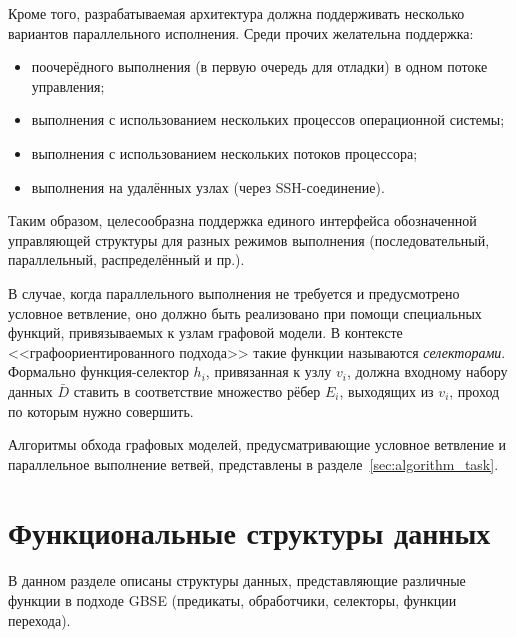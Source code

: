 Кроме того, разрабатываемая архитектура должна поддерживать несколько вариантов параллельного исполнения. Среди прочих желательна поддержка:
\begin{itemize}
    \item поочерёдного выполнения (в первую очередь для отладки) в одном потоке управления;
    \item выполнения с использованием нескольких процессов операционной системы;
    \item выполнения с использованием нескольких потоков процессора;
    \item выполнения на удалённых узлах (через SSH-соединение).
\end{itemize}

Таким образом, целесообразна поддержка единого интерфейса обозначенной управляющей структуры для разных режимов выполнения (последовательный, параллельный, распределённый и пр.).

В случае, когда параллельного выполнения не требуется и предусмотрено условное ветвление, оно должно быть реализовано при помощи специальных функций, привязываемых к узлам графовой модели. В контексте <<графоориентированного подхода>> такие функции называются \emph{селекторами}. Формально функция-селектор $h_i$, привязанная к узлу $v_i$, должна входному набору данных $\bar{D}$ ставить в соответствие множество рёбер $E_i$, выходящих из $v_i$, проход по которым нужно совершить.

Алгоритмы обхода графовых моделей, предусматривающие условное ветвление и параллельное выполнение ветвей, представлены в разделе~\ref{sec:algorithm_task}.
\section{Функциональные структуры данных}\label{sec:functional_classes}
В данном разделе описаны структуры данных, представляющие различные функции в подходе GBSE (предикаты, обработчики, селекторы, функции перехода).

